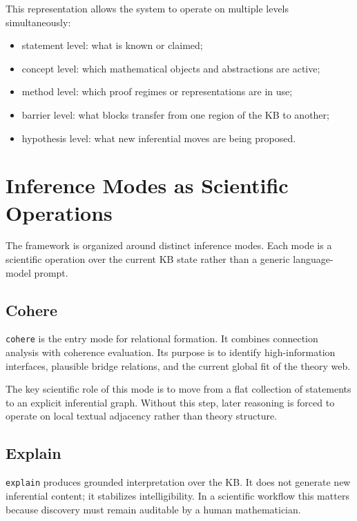 \documentclass[11pt]{article}
\begin{document}
This representation allows the system to operate on multiple levels simultaneously:

\begin{itemize}[leftmargin=*,itemsep=0.2em]
\item statement level: what is known or claimed;
\item concept level: which mathematical objects and abstractions are active;
\item method level: which proof regimes or representations are in use;
\item barrier level: what blocks transfer from one region of the KB to another;
\item hypothesis level: what new inferential moves are being proposed.
\end{itemize}

\section{Inference Modes as Scientific Operations}

The framework is organized around distinct inference modes. Each mode is a scientific operation over the current KB state rather than a generic language-model prompt.

\subsection{Cohere}

\texttt{cohere} is the entry mode for relational formation. It combines connection analysis with coherence evaluation. Its purpose is to identify high-information interfaces, plausible bridge relations, and the current global fit of the theory web.

The key scientific role of this mode is to move from a flat collection of statements to an explicit inferential graph. Without this step, later reasoning is forced to operate on local textual adjacency rather than theory structure.

\subsection{Explain}

\texttt{explain} produces grounded interpretation over the KB. It does not generate new inferential content; it stabilizes intelligibility. In a scientific workflow this matters because discovery must remain auditable by a human mathematician.
\end{document}
